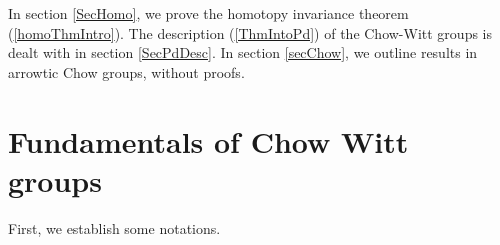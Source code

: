 \documentclass[12pt]{article}
\begin{document}
 In section \ref{SecHomo}, we prove the homotopy invariance theorem (\ref{homoThmIntro}). The description (\ref{ThmIntoPd}) of the Chow-Witt groups is dealt with in section \ref{SecPdDesc}. In section \ref{secChow}, we outline results in arrowtic Chow groups, without proofs. 


\section{Fundamentals of Chow Witt groups} \label{SecFunda}%
First, we establish some notations. 
\end{document}
